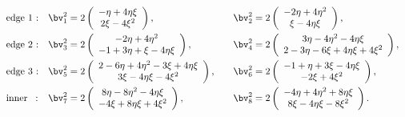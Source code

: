 \begin{equation}
\begin{aligned}
&\textrm{edge 1 :} &\bv_1^2&= 2 \left( \begin{array}{c} 
-\eta + 4 \eta \xi \\
 2 \xi - 4 \xi^2 
 \end{array} \right),& \quad 
  &\bv_2^2=2 \left( \begin{array}{c} 
-2 \eta + 4 \eta^2 \\
\xi - 4 \eta \xi
 \end{array} \right),& \\
&\textrm{edge 2 :}  &\bv_3^2 &= 2\left( \begin{array}{c} 
-2 \eta + 4 \eta^2 \\
 -1 + 3 \eta + \xi - 4 \eta \xi
 \end{array} \right),& \quad 
 &\bv_4^2 = 2\left( \begin{array}{c} 
3 \eta - 4 \eta^2 - 4 \eta \xi \\
 2 - 3 \eta - 6 \xi + 4 \eta \xi + 4 \xi^2
 \end{array} \right),& \\ 
&\textrm{edge 3 :}  &\bv_5^2 &= 2\left( \begin{array}{c} 
2 - 6 \eta + 4 \eta^2 - 3 \xi + 4 \eta \xi \\
 3 \xi - 4 \eta \xi - 4 \xi^2
 \end{array} \right),& \quad
 &\bv_6^2 = 2\left( \begin{array}{c} 
-1 + \eta + 3 \xi - 4 \eta \xi \\
 -2 \xi + 4 \xi^2
 \end{array} \right),& \\ 
&\textrm{inner \, :}  &\bv_7^2 &= 2\left( \begin{array}{c} 
8 \eta - 8 \eta^2 - 4 \eta \xi \\
-4 \xi + 8 \eta \xi +  4 \xi^2
 \end{array} \right),& \quad
  &\bv_8^2 = 2\left( \begin{array}{c} 
-4 \eta + 4 \eta^2 + 8 \eta \xi \\
8 \xi - 4 \eta \xi - 8 \xi^2
 \end{array} \right).&
 \end{aligned}
\end{equation}

